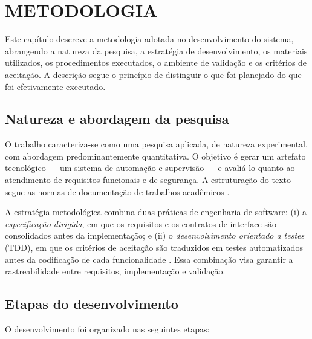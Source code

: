 \chapter{METODOLOGIA}

Este capítulo descreve a metodologia adotada no desenvolvimento do sistema,
abrangendo a natureza da pesquisa, a estratégia de desenvolvimento, os materiais
utilizados, os procedimentos executados, o ambiente de validação e os critérios
de aceitação. A descrição segue o princípio de distinguir o que foi planejado do
que foi efetivamente executado.

\section{Natureza e abordagem da pesquisa}

O trabalho caracteriza-se como uma pesquisa aplicada, de natureza experimental,
com abordagem predominantemente quantitativa. O objetivo é gerar um artefato
tecnológico --- um sistema de automação e supervisão --- e avaliá-lo quanto ao
atendimento de requisitos funcionais e de segurança. A estruturação do texto
segue as normas de documentação de trabalhos acadêmicos \cite{abnt14724,
abnt6023, abnt10520}.

A estratégia metodológica combina duas práticas de engenharia de software:
(i) a \emph{especificação dirigida}, em que os requisitos e os contratos de
interface são consolidados antes da implementação; e (ii) o \emph{desenvolvimento
orientado a testes} (TDD), em que os critérios de aceitação são traduzidos em
testes automatizados antes da codificação de cada funcionalidade
\cite{beck2002}. Essa combinação visa garantir a rastreabilidade entre
requisitos, implementação e validação.

\section{Etapas do desenvolvimento}

O desenvolvimento foi organizado nas seguintes etapas:

